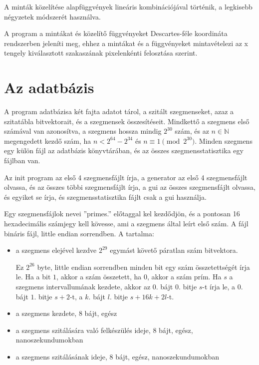 A minták közelítése alapfüggvények lineáris kombinációjával történik, a legkisebb négyzetek módszerét használva.

A program a mintákat és közelítő függvényeket Descartes-féle koordináta rendszerben jeleníti meg, ehhez a mintákat és a függvényeket mintavételezi az x tengely kiválasztott szakaszának pixelenkénti felosztása szerint.

\section{Az adatbázis}

A program adatbázisa két fajta adatot tárol, a szitált szegmenseket, azaz a szitatábla bitvektorait, és a szegmensek összesítéseit.
Mindkettő a szegmens első számával van azonosítva, a szegmens hossza mindig $2^{30}$ szám, és az $n \in \mathbb{N}$ megengedett kezdő szám, ha $n < 2^{64}-2^{34}$ és $n \equiv 1 \pmod{2^{30}}$.
Minden szegmens egy külön fájl az adatbázis könyvtárában, és az összes szegmensstatisztika egy fájlban van.

Az init program az első 4 szegmensfájlt írja, a generator az első 4 szegmensfájlt olvassa, és az összes többi szegmensfájlt írja, a gui az összes szegmensfájlt olvassa, és egyiket se írja, és szegmensstatisztika fájlt csak a gui használja.

Egy szegmensfájlok nevei ''primes.'' előtaggal kel kezdődjön, és a pontosan 16 hexadecimális számjegy kell kövesse, ami a szegmens által leírt első szám.
A fájl bináris fájl, {\color{red}little endian} sorrendben.
A tartalma:
\begin{itemize}
\item a szegmens elejével kezdve $2^{29}$ egymást követő páratlan szám bitvektora.
	
Ez $2^{26}$ byte, {\color{red}little endian} sorrendben minden bit egy szám összetettségét írja le.
Ha a bit $1$, akkor a szám összetett, ha $0$, akkor a szám prím.
Ha $s$ a szegmens intervallumának kezdete, akkor az $0.$ bájt $0.$ bitje $s$-t írja le, a $0.$ bájt $1.$ bitje $s+2$-t, a $k.$ bájt $l.$ bitje $s+16k+2l$-t.
	
\item a szegmens kezdete, 8 bájt, egész
\item a szegmens szitálására való felkészülés ideje, 8 bájt, egész, nanoszekundumokban
\item a szegmens szitálásának ideje, 8 bájt, egész, nanoszekundumokban
\end{itemize}

